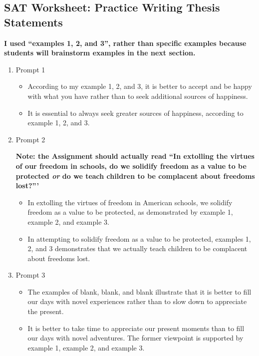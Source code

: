 \begin{enumerate}
\subsection{SAT Worksheet: Practice Writing Thesis Statements}

\textbf{I used ``examples 1, 2, and 3'', rather than specific examples because students will brainstorm examples in the next section.}

\begin{enumerate}
\item Prompt 1

\begin{itemize}
\item According to my example 1, 2, and 3, it is better to accept and be happy with what you have rather than to seek additional sources of happiness. 

\item It is essential to always seek greater sources of happiness, according to example 1, 2, and 3. 
\end{itemize}

\item Prompt 2

\textbf{Note: the Assignment should actually read ``In extolling the virtues of our freedom in schools, do we solidify freedom as a value to be protected \textit{or} do we teach children to be complacent about freedoms lost?'''}

\begin{itemize}
\item In extolling the virtues of freedom in American schools, we solidify freedom as a value to be protected, as demonstrated by example 1, example 2, and example 3. 

\item In attempting to solidify freedom as a value to be protected, examples 1, 2, and 3 demonstrates that we actually teach children to be complacent about freedoms lost. 

\end{itemize}

\item Prompt 3
\begin{itemize} 
\item The examples of blank, blank, and blank illustrate that it is better to fill our days with novel experiences rather than to slow down to appreciate the present. 

\item It is better to take time to appreciate our present moments than to fill our days with novel adventures. The former viewpoint is supported by example 1, example 2, and example 3. 


\end{itemize}
\end{enumerate}
\end{enumerate}
